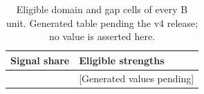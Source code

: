 \begin{table}[t]
\caption{Eligible domain and gap cells of every B unit. Generated table pending the v4 release; no value is asserted here.}\label{tab:v4-sgaps}
\centering\begin{tabular}{ll}\hline
Signal share & Eligible strengths \\\hline
[Insert generated rows] & [Generated values pending] \\\hline
\end{tabular}
\end{table}
